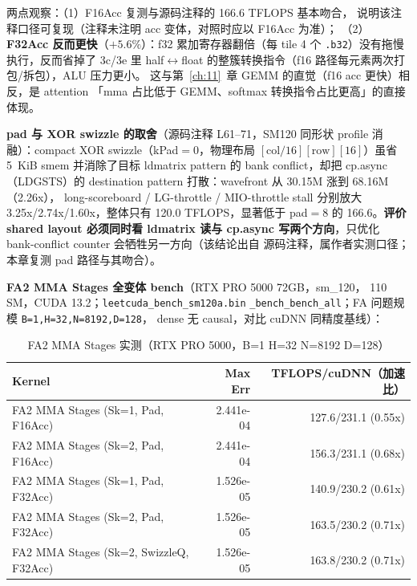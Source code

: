 两点观察：（1）F16Acc 复测与源码注释的 166.6 TFLOPS 基本吻合，
说明该注释口径可复现（注释未注明 acc 变体，对照时应以 F16Acc 为准）；
（2）\textbf{F32Acc 反而更快}（$+5.6\%$）：f32 累加寄存器翻倍（每 tile
4 个 \texttt{.b32}）没有拖慢执行，反而省掉了 3c/3e 里 half$\leftrightarrow$float
的整簇转换指令（f16 路径每元素两次打包/拆包），ALU 压力更小。
这与第~\ref{ch:11}~章 GEMM 的直觉（f16 acc 更快）相反，是 attention
「mma 占比低于 GEMM、softmax 转换指令占比更高」的直接体现。

\textbf{pad 与 XOR swizzle 的取舍}（源码注释 L61--71，SM120 同形状
profile 消融）：compact XOR swizzle（kPad$=$0，物理布局
$[\mathrm{col}/16][\mathrm{row}][16]$）虽省 5~KiB smem 并消除了目标
ldmatrix pattern 的 bank conflict，却把 cp.async（LDGSTS）的
destination pattern 打散：wavefront 从 30.15M 涨到 68.16M（2.26x），
long-scoreboard / LG-throttle / MIO-throttle stall 分别放大
3.25x/2.74x/1.60x，整体只有 120.0 TFLOPS，显著低于 pad$=$8 的
166.6。\textbf{评价 shared layout 必须同时看 ldmatrix 读与 cp.async
写两个方向}，只优化 bank-conflict counter 会牺牲另一方向（该结论出自
源码注释，属作者实测口径；本章复测 pad 路径与其吻合）。

\textbf{FA2 MMA Stages 全变体 bench}（RTX PRO 5000 72GB，sm\_120，
110 SM，CUDA 13.2；\texttt{leetcuda\_\allowbreak{}bench\_\allowbreak{}sm120a.\allowbreak{}bin}
\texttt{\_\allowbreak{}bench\_\allowbreak{}bench\_\allowbreak{}all}；FA 问题规模
\texttt{B=\allowbreak{}1,\allowbreak{}H=\allowbreak{}32,\allowbreak{}N=\allowbreak{}8192,\allowbreak{}D=\allowbreak{}128}，
dense 无 causal，对比 cuDNN 同精度基线）：

\begin{table}[H]
\centering
\caption{FA2 MMA Stages 实测（RTX PRO 5000，B=1 H=32 N=8192 D=128）}
\label{tab:ch16-perf}
\footnotesize
\setlength{\tabcolsep}{4pt}
\begin{tabular}{lrr}
\toprule
Kernel & Max Err & TFLOPS/cuDNN（加速比） \\
\midrule
FA2 MMA Stages (Sk=1, Pad, F16Acc) & 2.441e-04 & 127.6/231.1 (0.55x) \\
FA2 MMA Stages (Sk=2, Pad, F16Acc) & 2.441e-04 & 156.3/231.1 (0.68x) \\
FA2 MMA Stages (Sk=1, Pad, F32Acc) & 1.526e-05 & 140.9/230.2 (0.61x) \\
FA2 MMA Stages (Sk=2, Pad, F32Acc) & 1.526e-05 & 163.5/230.2 (0.71x) \\
FA2 MMA Stages (Sk=2, SwizzleQ, F32Acc) & 1.526e-05 & 163.8/230.2 (0.71x) \\
\bottomrule
\end{tabular}
\end{table}

